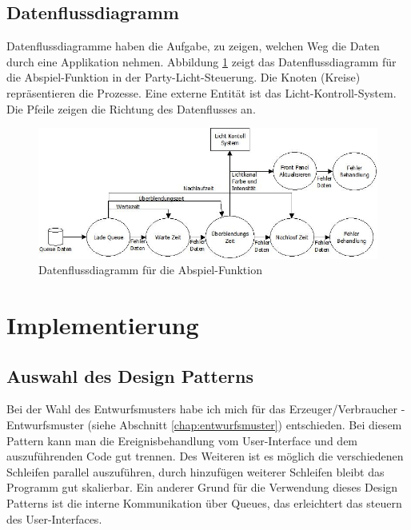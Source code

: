\subsection{Datenflussdiagramm}
Datenflussdiagramme haben die Aufgabe, zu zeigen, welchen Weg die Daten durch eine Applikation nehmen. Abbildung \ref{fig:plan02} zeigt das Datenflussdiagramm für die Abspiel-Funktion
in der Party-Licht-Steuerung. Die Knoten (Kreise) repräsentieren die Prozesse. 
Eine externe Entität ist das Licht-Kontroll-System. Die Pfeile zeigen die Richtung des Datenflusses an.
	\begin{figure}[!ht]
	\centering
		\includegraphics[width=\textwidth]{Pics/play-dataflow.jpeg}
	\caption{Datenflussdiagramm für die Abspiel-Funktion}
	\label{fig:plan02}
	\end{figure}	

	

\section{Implementierung}
\label{chap:impl}
		\subsection{Auswahl des Design Patterns} %
		\label{chap:designpattern} %
Bei der Wahl des Entwurfsmusters habe ich mich für das Erzeuger/Verbraucher - Entwurfsmuster (siehe Abschnitt \ref{chap:entwurfsmuster}) entschieden. Bei diesem Pattern kann man die Ereignisbehandlung vom User-Interface und dem auszuführenden Code gut trennen. Des Weiteren ist es möglich die verschiedenen Schleifen parallel auszuführen, durch hinzufügen weiterer Schleifen bleibt das Programm gut skalierbar. Ein anderer Grund für die Verwendung dieses Design Patterns ist die interne Kommunikation über Queues, das erleichtert das steuern des User-Interfaces.

